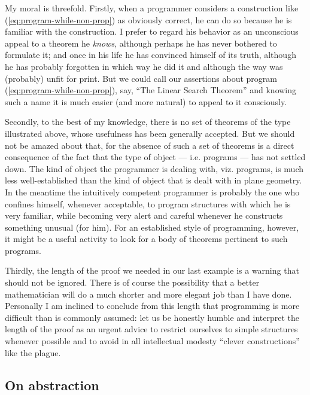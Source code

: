 My moral is threefold. Firstly, when a programmer considers a construction like (\ref{eq:program-while-non-prop}) as obviously correct, he can do so because he is familiar with the construction. I prefer to regard his behavior as an unconscious appeal to a theorem he \textit{knows}, although perhaps he has never bothered to formulate it; and once in his life he has convinced himself of its truth, although he has probably forgotten in which way he did it and although the way was (probably) unfit for print. But we could call our assertions about program (\ref{eq:program-while-non-prop}), say, ``The Linear Search Theorem'' and knowing such a name it is much easier (and more natural) to appeal to it consciously.

Secondly, to the best of my knowledge, there is no set of theorems of the type illustrated above, whose usefulness has been generally accepted. But we should not be amazed about that, for the absence of such a set of theorems is a direct consequence of the fact that the type of object --- i.e. programs --- has not settled down. The kind of object the programmer is dealing with, viz. programs, is much less well-established than the kind of object that is dealt with in plane geometry. In the meantime the intuitively competent programmer is probably the one who confines himself, whenever acceptable, to program structures with which he is very familiar, while becoming very alert and careful whenever he constructs something unusual (for him). For an established style of programming, however, it might be a useful activity to look for a body of theorems pertinent to such programs.

Thirdly, the length of the proof we needed in our last example is a warning that should not be ignored. There is of course the possibility that a better mathematician will do a much shorter and more elegant job than I have done. Personally I am inclined to conclude from this length that programming is more difficult than is commonly assumed: let us be honestly humble and interpret the length of the proof as an urgent advice to restrict ourselves to simple structures whenever possible and to avoid in all intellectual modesty ``clever constructions'' like the plague.

\subsection{On abstraction}

